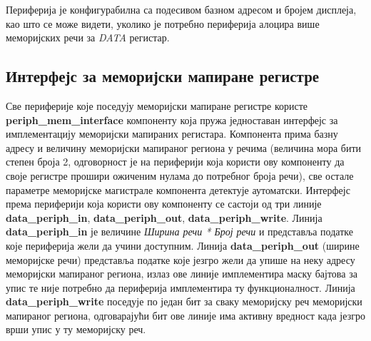 Периферија је конфигурабилна са подесивом базном адресом и бројем дисплеја, као што се може видети, уколико је потребно периферија алоцира више меморијских речи за \textit{DATA} регистар.\newpage

\subsection{Интерфејс за меморијски мапиране регистре}

Све периферије које поседују меморијски мапиране регистре користе \textbf{periph\_mem\_interface} компоненту која пружа једноставан интерфејс за имплементацију меморијски мапираних регистара. Компонента прима базну адресу и величину меморијски мапираног региона у речима (величина мора бити  степен броја 2, одговорност је на периферији која користи ову компоненту да своје регистре прошири ожиченим нулама до потребног броја речи), све остале параметре меморијске магистрале компонента детектује аутоматски. Интерфејс према периферији која користи ову компоненту се састоји од три линије \textbf{data\_periph\_in}, \textbf{data\_periph\_out}, \textbf{data\_periph\_write}. Линија \textbf{data\_periph\_in} је величине \textit{Ширина речи * Број речи} и представља податке које периферија жели да учини доступним. Линија \textbf{data\_periph\_out} (ширине меморијске речи) представља податке које језгро жели да упише на неку адресу меморијски мапираног региона, излаз ове линије имплементира маску бајтова за упис те није потребно да периферија имплементира ту функционалност. Линија \textbf{data\_periph\_write} поседује по један бит за сваку меморијску реч меморијски мапираног региона, одговарајући бит ове линије има активну вредност када језгро врши упис у ту меморијску реч.

